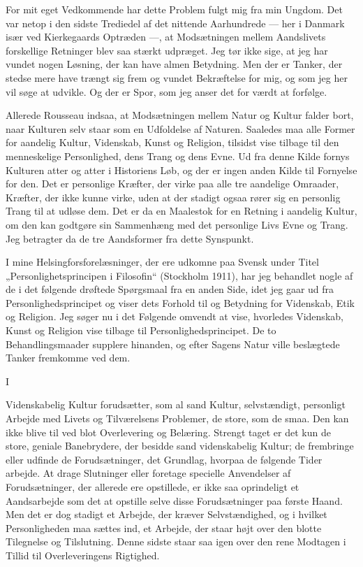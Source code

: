 \documentclass[12pt,a4paper,openany]{book}
\newcommand{\opage}[1]{\marginnote{\footnotesize\textit{[#1]}}}
\begin{document}
For mit eget Vedkommende har dette Problem fulgt mig
fra min Ungdom. Det var netop i den sidste Trediedel af det
nittende Aarhundrede --- her i Danmark især ved Kierkegaards
Optræden ---, at Modsætningen mellem Aandslivets forskellige
Retninger blev saa stærkt udpræget. Jeg tør ikke sige, at jeg
har vundet nogen Løsning, der kan have almen Betydning.
Men der er Tanker, der stedse mere have trængt sig frem og
vundet Bekræftelse for mig, og som jeg her vil søge at udvikle.
Og der er Spor, som jeg anser det for værdt at forfølge.


Allerede Rousseau indsaa, at Modsætningen mellem Natur
og Kultur falder bort, naar Kulturen selv staar som en Udfoldelse
af Naturen. Saaledes maa alle Former for aandelig Kultur,
Videnskab, Kunst og Religion, tilsidst vise tilbage til den
menneskelige Personlighed, dens Trang og dens Evne. Ud fra
denne Kilde fornys Kulturen atter og atter i Historiens Løb,
og der er ingen anden Kilde til Fornyelse for den. Det er
personlige Kræfter, der virke paa alle tre aandelige Omraader,
Kræfter, der ikke kunne virke, uden at der stadigt ogsaa rører
sig en personlig Trang til at udløse dem. Det er da en Maalestok
for en Retning i aandelig Kultur, om den kan godtgøre sin
Sammenhæng med det personlige Livs Evne og Trang. Jeg
betragter da de tre Aandsformer fra dette Synspunkt.

\setcounter{footnote}{0}%
\opage{4}I mine Helsingforsforelæsninger, der ere udkomne paa
Svensk under Titel „Personlighetsprincipen i Filosofin“ (Stockholm
1911), har jeg behandlet nogle af de i det følgende drøftede
Spørgsmaal fra en anden Side, idet jeg gaar ud fra Personlighedsprincipet
og viser dets Forhold til og Betydning for
Videnskab, Etik og Religion. Jeg søger nu i det Følgende omvendt
at vise, hvorledes Videnskab, Kunst og Religion vise tilbage
til Personlighedsprincipet. De to Behandlingsmaader supplere
hinanden, og efter Sagens Natur ville beslægtede Tanker
fremkomme ved dem.

\begin{center}I\end{center}


Videnskabelig Kultur forudsætter, som al sand Kultur,
selvstændigt, personligt Arbejde med Livets og Tilværelsens
Problemer, de store, som de smaa. Den kan ikke blive til
ved blot Overlevering og Belæring. Strengt taget er det kun
de store, geniale Banebrydere, der besidde sand videnskabelig
Kultur; de frembringe eller udfinde de Forudsætninger, det
Grundlag, hvorpaa de følgende Tider arbejde. At drage Slutninger
eller foretage specielle Anvendelser af Forudsætninger,
der allerede ere opstillede, er ikke saa oprindeligt et Aandsarbejde
som det at opstille selve disse Forudsætninger paa første
Haand. Men det er dog stadigt et Arbejde, der kræver Selvstændighed,
og i hvilket Personligheden maa sættes ind, et
Arbejde, der staar højt over den blotte Tilegnelse og Tilslutning.
Denne sidste staar saa igen over den rene Modtagen i
Tillid til Overleveringens Rigtighed.
\end{document}
